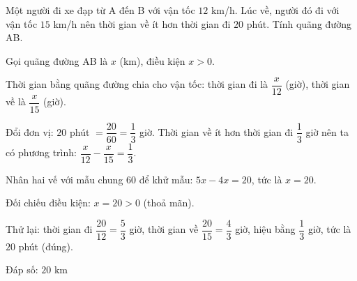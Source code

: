 \begin{problem}[8DS-PT1-039]
Một người đi xe đạp từ A đến B với vận tốc $12$ km/h. Lúc về, người đó đi với vận tốc $15$ km/h nên thời gian về ít hơn thời gian đi $20$ phút. Tính quãng đường AB.

\begin{solution}
Gọi quãng đường AB là $x$ (km), điều kiện $x > 0$.

Thời gian bằng quãng đường chia cho vận tốc: thời gian đi là $\dfrac{x}{12}$ (giờ), thời gian về là $\dfrac{x}{15}$ (giờ).

Đổi đơn vị: $20$ phút $= \dfrac{20}{60} = \dfrac{1}{3}$ giờ. Thời gian về ít hơn thời gian đi $\dfrac{1}{3}$ giờ nên ta có phương trình: $\dfrac{x}{12} - \dfrac{x}{15} = \dfrac{1}{3}$.

Nhân hai vế với mẫu chung $60$ để khử mẫu: $5x - 4x = 20$, tức là $x = 20$.

Đối chiếu điều kiện: $x = 20 > 0$ (thoả mãn).

Thử lại: thời gian đi $\dfrac{20}{12} = \dfrac{5}{3}$ giờ, thời gian về $\dfrac{20}{15} = \dfrac{4}{3}$ giờ, hiệu bằng $\dfrac{1}{3}$ giờ, tức là $20$ phút (đúng).

Đáp số: $\boxed{20 \text{ km}}$
\end{solution}
\end{problem}

